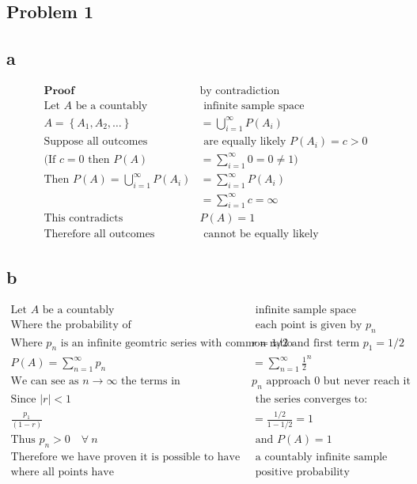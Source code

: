 \documentclass{article}
\begin{document}
\begin{flushleft}
\section*{Problem 1}
\subsection*{a}
\begin{align*}
\textbf{Proof } &\text{by contradiction}\\
\text{Let } A \text{ be a countably}&\text{ infinite sample space}\\ A=\left\{A_1,A_2,\dots \right\}&=\bigcup_{i=1}^{\infty}P(A_i)\\
\text{Suppose all outcomes}& \text{ are equally likely } P(A_i)=c>0\\
(\text{If } c=0 \text{ then } P(A)&=\sum \limits_{i=1}^{\infty}0=0\neq1)\\ 
\text{Then }P(A)=\bigcup_{i=1}^{\infty}P(A_i)&=\sum\limits_{i=1}^{\infty}P(A_i)\\
&=\sum\limits_{i=1}^{\infty}c=\infty\\
\text{This contradicts } &P(A)=1\\
\text{Therefore all outcomes}& \text{ cannot be equally likely} 
\end{align*}
\subsection*{b}
\begin{align*}
\text{Let } A \text{ be a countably}&\text{ infinite sample space}\\
\text{Where the probability of}&\text{ each point is given by } p_n\\
\text{Where } p_n \text{ is an infinite geomtric series with common ratio }& r=1/2 \text{ and first term } p_1=1/2\\
P(A)=\sum \limits_{n=1}^{\infty}p_n&=\sum \limits_{n=1}^{\infty}\frac{1}{2}^n\\
\text{We can see as } n \to \infty \text{ the terms in } &p_n \text{ approach 0 but never reach it}\\
\text{Since } |r|<1 &\text{ the series converges to:}\\ \frac{p_1}{(1-r)}&=\frac{1/2}{1-1/2}=1\\
\text{Thus } p_n>0 \quad \forall \ n &\text{ and } P(A)=1\\
\text{Therefore we have proven it is possible to have}& \text{ a countably infinite sample space}\\
\text{where all points have}&\text{ positive probability} 
\end{align*}
\pagebreak

\end{flushleft}
\end{document}
